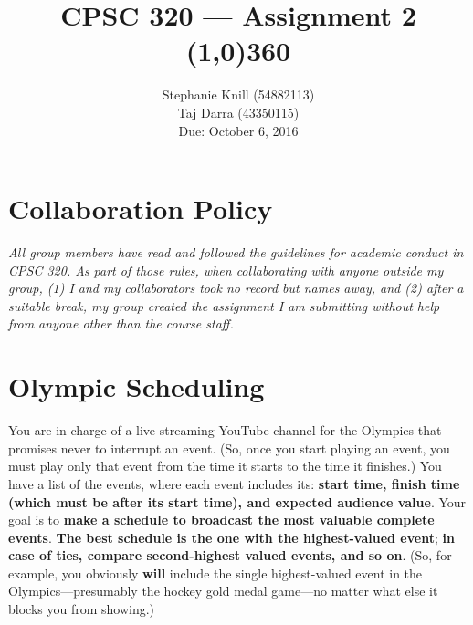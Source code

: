 \documentclass[11pt, oneside]{article}   	%
\theoremstyle{definition}
\theoremstyle{remark}
\begin{document}
\title{CPSC 320 --- Assignment 2 \\
\line(1,0){360} \\              %
}
\author{
Stephanie Knill (54882113) \\
Taj Darra (43350115) \\
Due: October 6, 2016}

\date{}                   %
\maketitle




\section*{Collaboration Policy}
\emph{All group members have read and followed the guidelines for academic conduct in CPSC 320. As part of those rules, when collaborating with anyone outside my group, (1) I and my collaborators took no record but names away, and (2) after a suitable break, my group created the assignment I am submitting without help from anyone other than the course staff.}

\section{Olympic Scheduling}
You are in charge of a live-streaming YouTube channel for the Olympics
that promises never to interrupt an event. (So, once you start playing
an event, you must play only that event from the time it starts to the
time it finishes.) You have a list of the events, where each event
includes its: \textbf{start time, finish time (which must be after its start time), and expected audience value}. Your goal is to \textbf{make a schedule to broadcast the most valuable complete events}. \textbf{The best schedule is the one with the highest-valued event}; \textbf{in case of ties, compare second-highest valued events, and so on}. (So, for example, you
obviously \textbf{will} include the single highest-valued event in the
Olympics---presumably the hockey gold medal game---no matter what else
it blocks you from showing.)
\end{document}
